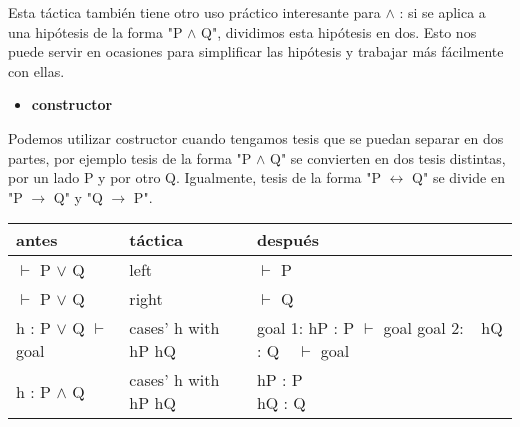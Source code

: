 \documentclass{article}
\begin{document}
Esta táctica también tiene otro uso práctico interesante para $\land$ : si se aplica a una hipótesis de la forma "P $\land$ Q", dividimos esta hipótesis en dos. Esto nos puede servir en ocasiones para simplificar las hipótesis y trabajar más fácilmente con ellas.

\begin{itemize}
    \item \textbf{constructor}
\end{itemize}

Podemos utilizar costructor cuando tengamos tesis que se puedan separar en dos partes, por ejemplo tesis de la forma "P $\land$ Q" se convierten en dos tesis distintas, por un lado P y por otro Q. Igualmente, tesis de la forma "P $\leftrightarrow$ Q" se divide en "P $\rightarrow$ Q" y "Q $\rightarrow$ P".


\begin{center}
\begin{tabular}{ | m{8em} | m{8em}| m{8em} | } 
  \hline
  \textbf{antes} & \textbf{táctica} & \textbf{después} \\
  \hline
  $\vdash$ P $\lor$ Q & left & $\vdash$ P \\
  \hline
  $\vdash$ P $\lor$ Q & right & $\vdash$ Q \\
  \hline
  \parbox{8em}{h : P $\lor$ Q \\ $\vdash$ goal} & cases' h with hP hQ & \parbox{8em}{goal 1: \\ hP : P \\ $\vdash$ goal \\[1ex] goal 2: \\ $~~$ hQ : Q \\ $~~$ $\vdash$ goal} \\
  \hline
  h : P $\land$ Q & cases' h with hP hQ & \parbox{8em}{hP : P \\ hQ : Q }\\
  \hline
  
\end{tabular}
\end{center}




\end{document}

